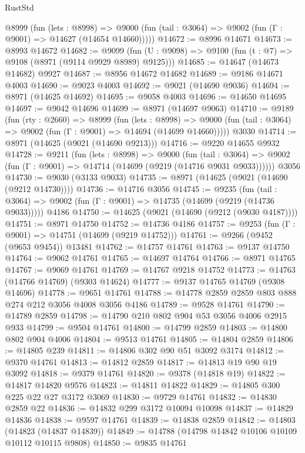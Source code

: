 \begin{lexlean}{RustStd}
\begin{coremodule}
    @8999
      (fun (lets : @8998) =>
      @9000 (fun (tail : @3064) => @9002 (fun (Γ : @9001) => @14627 (@14654 @14660)))))
@14672 := @8996 @14671
@14673 := @8993 @14672
@14682 := @9099 (fun (U : @9098) => @9100 (fun (t : @7) => @9108 (@8971 (@9114 @9929 @8989) @9125)))
@14685 := @14647 (@14673 @14682) @9927
@14687 := @8956 @14672 @14682
@14689 := @9186 @14671 @4003
@14690 := @9023 @4003
@14692 := @9021 (@14690 @9036)
@14694 := @8971 (@14625 @14692)
@14695 := @9058 @4003
@14696 := @14650 @14695
@14697 := @9042 @14696
@14699 := @8971 (@14697 @9063)
@14710 := @9189
    (fun (rty : @2660) =>
    @8999
      (fun (lets : @8998) =>
      @9000 (fun (tail : @3064) => @9002 (fun (Γ : @9001) => @14694 (@14699 @14660)))))
    @3030
@14714 := @8971 (@14625 (@9021 (@14690 @9213)))
@14716 := @9220 @14655 @9932
@14728 := @9211
    (fun (lets : @8998) =>
    @9000
      (fun (tail : @3064) =>
      @9002 (fun (Γ : @9001) => @14714 (@14699 (@9219 (@14716 @9031 @9033))))))
    @3056
@14730 := @9030 (@3133 @9033)
@14735 := @8971 (@14625 (@9021 (@14690 (@9212 @14730))))
@14736 := @14716 @3056
@14745 := @9235
    (fun (tail : @3064) => @9002 (fun (Γ : @9001) => @14735 (@14699 (@9219 (@14736 @9033)))))
    @4186
@14750 := @14625 (@9021 (@14690 (@9212 (@9030 @4187))))
@14751 := @8971 @14750
@14752 := @14736 @4186
@14757 := @9253 (fun (Γ : @9001) => @14751 (@14699 (@9219 @14752)))
@14761 := @9266 (@9452 (@9653 @9454)) @13481
@14762 := @14757 @14761
@14763 := @9137 @14750
@14764 := @9062 @14761
@14765 := @14697 @14764
@14766 := @8971 @14765
@14767 := @9069 @14761
@14769 := @14767 @9218 @14752
@14773 := @14763 (@14766 @14769) (@9303 @14624)
@14777 := @9137 @14765 @14769 (@9308 @14696)
@14778 := @9651 @14761
@14788 := @14778 @2859 @2859 @803 @888 @274 @212 @3056 @4008 @3056 @4186
@14789 := @9528 @14761
@14790 := @14789 @2859
@14798 := @14790 @210 @802 @904 @53 @3056 @4006 @2915 @933
@14799 := @9504 @14761
@14800 := @14799 @2859
@14803 := @14800 @802 @904 @4006
@14804 := @9513 @14761
@14805 := @14804 @2859
@14806 := @14805 @239
@14811 := @14806 @302 @90 @51 @3092 @3174
@14812 := @9370 @14761
@14813 := @14812 @2859
@14817 := @14813 @19 @90 @19 @3092
@14818 := @9379 @14761
@14820 := @9378 (@14818 @19)
@14822 := @14817 @14820 @9576
@14823 := @14811 @14822
@14829 := @14805 @300 @225 @22 @27 @3172 @3069
@14830 := @9729 @14761
@14832 := @14830 @2859 @22
@14836 := @14832 @299 @3172 @10094 @10098
@14837 := @14829 @14836
@14838 := @9597 @14761
@14839 := @14838 @2859
@14842 := @14803 (@14823 (@14837 @14839))
@14849 := @14788 (@14798 @14842 @10106 @10109 @10112 @10115 @9808)
@14850 := @9835 @14761

\end{coremodule}
\end{lexlean}
